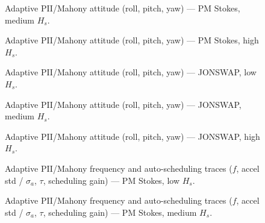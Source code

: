 \documentclass[11pt,letterpaper]{article}
\begin{document}
\begin{figure}[H]\centering
  \resizebox{\textwidth}{!}{}
  \caption{Adaptive PII/Mahony attitude (roll, pitch, yaw) --- PM Stokes, medium $H_s$.}
  \label{fig:w3d_nonkalman_pmstokes_medium_angles}
\end{figure}

\begin{figure}[H]\centering
  \resizebox{\textwidth}{!}{}
  \caption{Adaptive PII/Mahony attitude (roll, pitch, yaw) --- PM Stokes, high $H_s$.}
  \label{fig:w3d_nonkalman_pmstokes_high_angles}
\end{figure}

\begin{figure}[H]\centering
  \resizebox{\textwidth}{!}{}
  \caption{Adaptive PII/Mahony attitude (roll, pitch, yaw) --- JONSWAP, low $H_s$.}
  \label{fig:w3d_nonkalman_jonswap_low_angles}
\end{figure}

\begin{figure}[H]\centering
  \resizebox{\textwidth}{!}{}
  \caption{Adaptive PII/Mahony attitude (roll, pitch, yaw) --- JONSWAP, medium $H_s$.}
  \label{fig:w3d_nonkalman_jonswap_medium_angles}
\end{figure}

\begin{figure}[H]\centering
  \resizebox{\textwidth}{!}{}
  \caption{Adaptive PII/Mahony attitude (roll, pitch, yaw) --- JONSWAP, high $H_s$.}
  \label{fig:w3d_nonkalman_jonswap_high_angles}
\end{figure}

\begin{figure}[H]\centering
  \resizebox{\textwidth}{!}{}
  \caption{Adaptive PII/Mahony frequency and auto-scheduling traces ($f$, accel std / $\sigma_a$, $\tau$, scheduling gain) --- PM Stokes, low $H_s$.}
  \label{fig:w3d_nonkalman_pmstokes_low_tuner}
\end{figure}

\begin{figure}[H]\centering
  \resizebox{\textwidth}{!}{}
  \caption{Adaptive PII/Mahony frequency and auto-scheduling traces ($f$, accel std / $\sigma_a$, $\tau$, scheduling gain) --- PM Stokes, medium $H_s$.}
  \label{fig:w3d_nonkalman_pmstokes_medium_tuner}
\end{figure}
\end{document}
